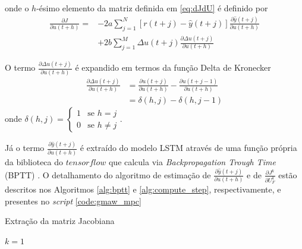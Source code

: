 onde o $h$-ésimo elemento da matriz definida em \ref{eq:dJdU} é definido por 
\begin{align}\label{eq:dJdu}
    \frac{\partial J}{\partial u(t+h)} = &-2a\sum_{j=1}^N [r(t+j) - \hat{y}(t+j)] \frac{\partial \hat{y}(t+j)}{\partial u(t+h)} \\
    &+2b\sum_{j=1}^M \Delta u(t+j) \frac{\partial \Delta u(t+j)}{\partial u(t+h)}
\end{align}

O termo $\frac{\partial \Delta u(t+j)}{\partial u(t+h)}$ é expandido em termos da função Delta de Kronecker 
\begin{align}
    \frac{\partial \Delta u(t+j)}{\partial u(t+h)} &= \frac{\partial u(t+j)}{\partial u(t+h)} - \frac{\partial u(t+j-1)}{\partial u(t+h)} \\
    &= \delta(h,j) - \delta(h,j-1)
\end{align}
onde $\delta(h,j)=\begin{cases}
    1 & \text{se } h=j \\
    0 & \text{se } h \neq j
\end{cases}$. 

Já o termo $\frac{\partial \hat{y}(t+j)}{\partial u(t+h)}$ é extraído do modelo LSTM através de uma função própria da biblioteca do $tensorflow$ \cite{tensorflow2015} que calcula via \textit{Backpropagation Trough Time} (BPTT) \cite{lillicrap2019backpropagation}. O detalhamento do algoritmo de estimação de $\frac{\partial \hat{y}(t+j)}{\partial u(t+h)}$ e de $\frac{\partial J^k}{\partial U_F^k}$ estão descritos nos Algoritmos \ref{alg:bptt} e \ref{alg:compute_step}, respectivamente, e presentes no \textit{script} \ref{code:gmaw_mpc}
\newpage
\begin{algorithm}{
    \label{alg:bptt}
    \caption{Extração da matriz Jacobiana}
    $k = 1$\;\\
}
\end{algorithm}

